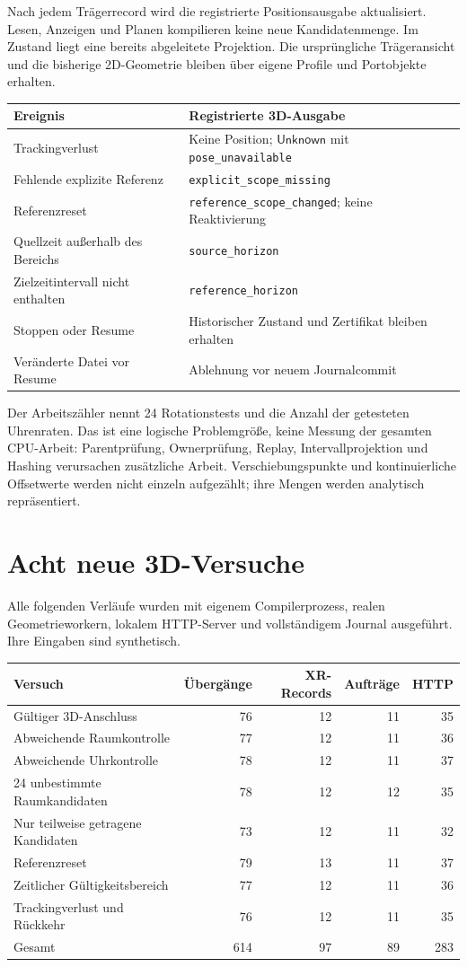\documentclass[11pt,a4paper]{article}
\newcommand{\Unknown}{\ensuremath{\mathsf{Unknown}}}
\newcommand{\nextsection}[2]{\clearpage{\color{accent}\small\textsf{#1}}\section{#2}}
\begin{document}
Nach jedem Trägerrecord wird die registrierte Positionsausgabe
aktualisiert. Lesen, Anzeigen und Planen kompilieren keine neue
Kandidatenmenge. Im Zustand liegt eine bereits abgeleitete Projektion.
Die ursprüngliche Trägeransicht und die bisherige 2D-Geometrie
bleiben über eigene Profile und Portobjekte erhalten.

\begin{tabularx}{\linewidth}{@{}lY@{}}\toprule
Ereignis & Registrierte 3D-Ausgabe\\\midrule
Trackingverlust & Keine Position; \Unknown{} mit \texttt{pose\_unavailable}\\
Fehlende explizite Referenz & \texttt{explicit\_scope\_missing}\\
Referenzreset & \texttt{reference\_scope\_changed}; keine Reaktivierung\\
Quellzeit außerhalb des Bereichs & \texttt{source\_horizon}\\
Zielzeitintervall nicht enthalten & \texttt{reference\_horizon}\\
Stoppen oder Resume & Historischer Zustand und Zertifikat bleiben erhalten\\
Veränderte Datei vor Resume & Ablehnung vor neuem Journalcommit\\\bottomrule
\end{tabularx}

Der Arbeitszähler nennt 24 Rotationstests und die Anzahl der
getesteten Uhrenraten. Das ist eine logische Problemgröße, keine
Messung der gesamten CPU-Arbeit: Parentprüfung, Ownerprüfung,
Replay, Intervallprojektion und Hashing verursachen zusätzliche
Arbeit. Verschiebungspunkte und kontinuierliche Offsetwerte werden
nicht einzeln aufgezählt; ihre Mengen werden analytisch repräsentiert.

\nextsection{96 / AUSGEFÜHRTE NACHWEISE}{Acht neue 3D-Versuche}
Alle folgenden Verläufe wurden mit eigenem Compilerprozess,
realen Geometrieworkern, lokalem HTTP-Server und vollständigem
Journal ausgeführt. Ihre Eingaben sind synthetisch.

\begin{tabularx}{\linewidth}{@{}Yrrrr@{}}\toprule
Versuch & Übergänge & XR-Records & Aufträge & HTTP\\\midrule
Gültiger 3D-Anschluss & 76 & 12 & 11 & 35\\
Abweichende Raumkontrolle & 77 & 12 & 11 & 36\\
Abweichende Uhrkontrolle & 78 & 12 & 11 & 37\\
24 unbestimmte Raumkandidaten & 78 & 12 & 12 & 35\\
Nur teilweise getragene Kandidaten & 73 & 12 & 11 & 32\\
Referenzreset & 79 & 13 & 11 & 37\\
Zeitlicher Gültigkeitsbereich & 77 & 12 & 11 & 36\\
Trackingverlust und Rückkehr & 76 & 12 & 11 & 35\\\midrule
Gesamt & 614 & 97 & 89 & 283\\\bottomrule
\end{tabularx}
\end{document}
